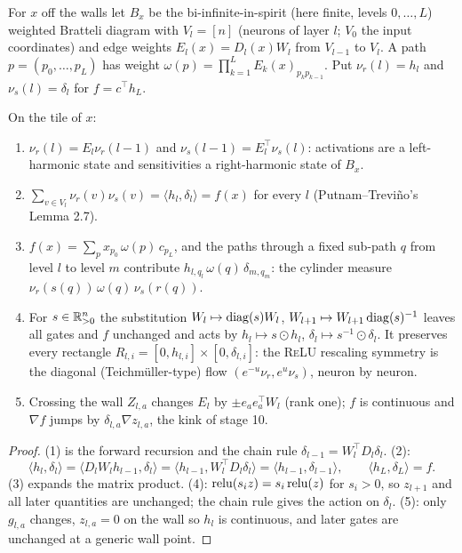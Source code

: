 \label{sec:cocycle}
\begin{definition}
For $x$ off the walls let $B_x$ be the bi-infinite-in-spirit (here finite, levels $0,\dots,L$) weighted Bratteli diagram with
$V_l=[n]$ (neurons of layer $l$; $V_0$ the input coordinates) and edge weights $E_l(x)=D_l(x)W_l$ from $V_{l-1}$ to $V_l$. A path
$p=(p_0,\dots,p_L)$ has weight $\omega(p)=\prod_{k=1}^LE_k(x)_{p_kp_{k-1}}$. Put $\nu_r(l)=h_l$ and $\nu_s(l)=\delta_l$ for $f=c^\top h_L$.
\end{definition}
\begin{theorem}\label{thm:bratteli}
On the tile of $x$:
\begin{enumerate}[leftmargin=*]
\item $\nu_r(l)=E_l\nu_r(l-1)$ and $\nu_s(l-1)=E_l^{\top}\nu_s(l)$: activations are a left-harmonic state and sensitivities a right-harmonic
state of $B_x$.
\item $\sum_{v\in V_l}\nu_r(v)\nu_s(v)=\langle h_l,\delta_l\rangle=f(x)$ for every $l$ (Putnam--Trevi\~no's Lemma 2.7).
\item $f(x)=\sum_{p}x_{p_0}\,\omega(p)\,c_{p_L}$, and the paths through a fixed sub-path $q$ from level $l$ to level $m$ contribute
$h_{l,q_l}\,\omega(q)\,\delta_{m,q_m}$: the cylinder measure $\nu_r(s(q))\,\omega(q)\,\nu_s(r(q))$.
\item For $s\in\mathbb R^n_{>0}$ the substitution $W_l\mapsto\operatorname{diag}(s)W_l$, $W_{l+1}\mapsto W_{l+1}\operatorname{diag}(s)^{-1}$ leaves all gates and $f$ unchanged and acts by
$h_l\mapsto s\odot h_l$, $\delta_l\mapsto s^{-1}\odot\delta_l$. It preserves every rectangle $R_{l,i}=[0,h_{l,i}]\times[0,\delta_{l,i}]$: the
\textsc{ReLU} rescaling symmetry is the diagonal (Teichm\"uller-type) flow $(e^{-u}\nu_r,e^{u}\nu_s)$, neuron by neuron.
\item Crossing the wall $Z_{l,a}$ changes $E_l$ by $\pm e_ae_a^{\top}W_l$ (rank one); $f$ is continuous and $\nabla f$ jumps by
$\delta_{l,a}\nabla z_{l,a}$, the kink of stage 10.
\end{enumerate}
\end{theorem}
\begin{proof}
(1) is the forward recursion and the chain rule $\delta_{l-1}=W_l^{\top}D_l\delta_l$. (2):
\[
\langle h_l,\delta_l\rangle=\langle D_lW_lh_{l-1},\delta_l\rangle=\langle h_{l-1},W_l^{\top}D_l\delta_l\rangle=\langle h_{l-1},\delta_{l-1}\rangle,\qquad\langle h_L,\delta_L\rangle=f.
\] (3) expands the matrix product. (4): $\operatorname{relu}(s_iz)=s_i\operatorname{relu}(z)$ for $s_i>0$, so
$z_{l+1}$ and all later quantities are unchanged; the chain rule gives the action on $\delta_l$. (5): only $g_{l,a}$ changes, $z_{l,a}=0$ on the
wall so $h_l$ is continuous, and later gates are unchanged at a generic wall point.
\end{proof}
